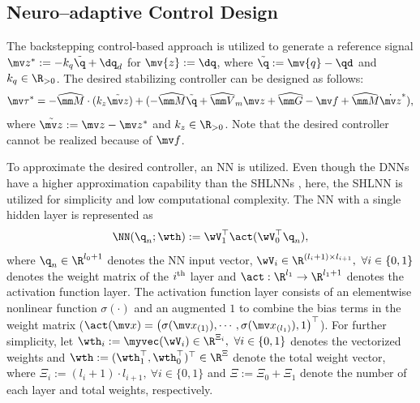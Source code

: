 \documentclass[letterpaper, 10 pt, conference]{ieeeconf}  %
\begin{document}
\subsection{Neuro–adaptive Control Design} \label{sec:ctrl dev}

The backstepping control-based approach is utilized to generate a reference signal $\mv z^*:= -{k_q}\tilde {\q}+\dq_d$ for $\mv {z}:= \dq$, where $\tilde {\q}:= \mv {q} - \qd$ and $k_q\in\R_{>0}$.
The desired stabilizing controller can be designed as follows:
\begin{equation}
    \mv \tau^* = 
    -\widehat{\mm M}\cdot ({k_z}\tilde {\mv z})
    + 
    ( 
        -\widehat{\mm M}\tilde {\q}
        +
        \widehat{\mm V}_m{\mv z}
        +
        \widehat{\mm G}
        -
        \mv f
        +
        \widehat{\mm M} \dot {\mv z}^*
    ) 
    ,
    \label{eq. desired control}
\end{equation}
where $\tilde {\mv z}:= \mv z-\mv z^*$ and $k_z\in\R_{>0}$.
Note that the desired controller cannot be realized because of $\mv f$.

To approximate the desired controller, an NN is utilized.
\color{red}
    Even though the DNNs have a higher approximation capability than the SHLNNs \cite{Rolnick:2017aa}, here, the SHLNN is utilized for simplicity and low computational complexity.
\color{black}
The NN with a single hidden layer is represented as 
\begin{equation}
    \NN({\q_{n}};\wth):= \wV_1^\top \act(\wV_0^\top {\q_{n}})
    ,
\end{equation}
where ${\q_{n}}\in\R^{l_0+1}$ denotes the NN input vector, $\wV_i\in\R^{(l_i+1)\times l_{i+1}},\ \forall i\in\{0,1\}$ denotes the weight matrix of the $i\textsuperscript{th}$ layer and $\act:\R^{l_1}\to\R^{l_1+1}$ denotes the activation function layer.
The activation function layer consists of an elementwise nonlinear function $\sigma(\cdot)$ and an augmented $1$ to combine the bias terms in the weight matrix (\ie $\act(\mv x) = \left(\sigma(\mv x_{(1)}),\cdots, \sigma(\mv x_{(l_1)}), 1\right)^\top $).
For further simplicity, let $\wth_i:= \myvec(\wV_i)\in\R^{\Xi_i},\ \forall i\in\{0,1\}$ denotes the vectorized weights and $\wth:=(\wth_1^\top ,\wth_0^\top )^\top \in\R^{\Xi}$ denote the total weight vector, where $\Xi_i:=(l_i+1)\cdot l_{i+1},\ \forall i\in\{0,1\}$ and $\Xi:=\Xi_0+\Xi_1$ denote the number of each layer and total weights, respectively.
\end{document}
